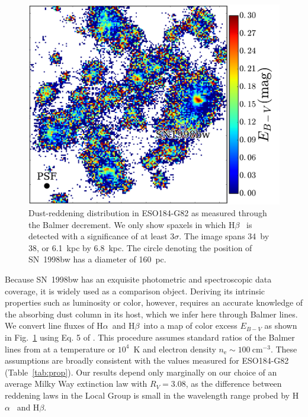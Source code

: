 \documentclass[traditabstract]{aa}
\newcommand{\hb}{H$\beta$}
\newcommand{\ha}{H$\alpha$}
\begin{document}
\begin{figure}
\includegraphics[angle=0, width=0.99\columnwidth]{Figs/MUSE_SN1998bw_EB-V.pdf}
\caption{Dust-reddening distribution in ESO184-G82 as measured through the Balmer decrement. We only show spaxels in which \hb~ is detected with a significance of at least $3\sigma$. The image spans 34\arcsec~by 38\arcsec, or 6.1~kpc by 6.8~kpc. The circle denoting the position of SN~1998bw has a {diameter} of 160~pc.}
\label{fig:ebv}
\end{figure}

Because SN~1998bw has an exquisite photometric and spectroscopic data coverage, it is widely used as a comparison object. Deriving its intrinsic properties such as luminosity or color, however, requires an accurate knowledge of the absorbing dust column in its host, which we infer here through Balmer lines. We convert line fluxes of \ha~and \hb~into a map of color excess $E_{B-V}$ as shown in Fig.~\ref{fig:ebv} using Eq. 5 of \citet{2015A&A...581A.125K}. This procedure assumes standard ratios of the Balmer lines from \citet{1989agna.book.....O} at a temperature or $10^4$~K and electron density $n_{\mathrm{e}}\sim100~\mathrm{cm}^{-3}$. These assumptions are broadly consistent with the values measured for ESO184-G82 (Table~\ref{tab:prop}). Our results depend only marginally on our choice of an average Milky Way extinction law \citep{1992ApJ...395..130P} with $R_V=3.08$, as the difference between reddening laws in the Local Group is small in the wavelength range probed by \ha~ and \hb. 
\end{document}
